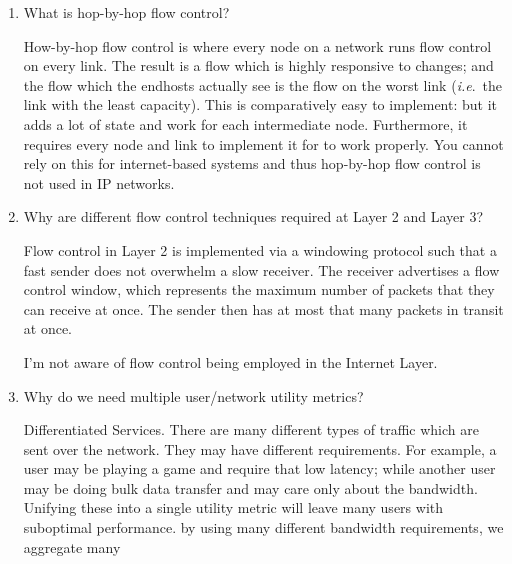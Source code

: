 \documentclass[10pt,\jkfside,a4paper]{article}
\begin{document}
\begin{enumerate}
\begin{enumerate}
        \item What is hop-by-hop flow control?

        How-by-hop flow control is where every node on a network runs flow control on every link. The result is a flow which is highly responsive to changes; and the flow which the endhosts actually see is the
        flow on the worst link (\emph{i.e}.\ the link with the least capacity). This is comparatively easy to implement: but it adds a lot of state and work for each intermediate node. Furthermore, it requires
        every node and link to implement it for to work properly. You cannot rely on this for internet-based systems and thus hop-by-hop flow control is not used in IP networks.

        \item Why are different flow control techniques required at Layer 2 and Layer 3?

        Flow control in Layer 2 is implemented via a windowing protocol such that a fast sender does not overwhelm a slow receiver. The receiver advertises a flow control window, which represents the maximum
        number of packets that they can receive at once. The sender then has at most that many packets in transit at once.

        I'm not aware of flow control being employed in the Internet Layer.

        \item Why do we need multiple user/network utility metrics?

        Differentiated Services. There are many different types of traffic which are sent over the network. They may have different requirements. For example, a user may be playing a game and require that low
        latency; while another user may be doing bulk data transfer and may care only about the bandwidth. Unifying these into a single utility metric will leave many users with suboptimal performance.
        by using many different bandwidth requirements, we aggregate many

    \end{enumerate}

\end{enumerate}
\end{document}
